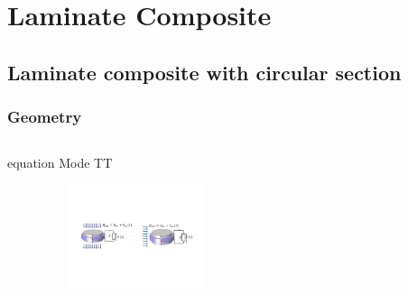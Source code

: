 \documentclass[compress]{beamer}
\begin{document}
\section{Laminate Composite}
\subsection{Laminate composite with circular section}

\begin{frame}\frametitle{Geometry}
\begin{columns}[totalwidth=\textwidth] 
	\begin{column}{.9\textwidth}  
	\end{column}
	\end{columns}
\vspace{0.3cm}	
\begin{columns}[totalwidth=\textwidth]
   \begin{column}{.49\textwidth}
       \begin{beamercolorbox}[sep=8pt,center]{equation}
      Mode TT 
      \end{beamercolorbox}
\centering \includegraphics[height=3cm,width=0.9\textwidth]{Graphic/03_circuitTT.pdf}
   \end{column}
   \begin{column}{.49\textwidth}

\end{column}
\end{columns}
\end{frame}
\end{document}
